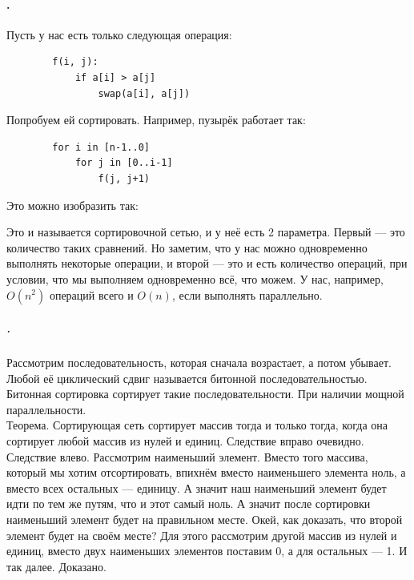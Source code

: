\documentclass{article}
\newcommand{\pseudo}{PseudoLexer.py:PseudoLexer -x}
\begin{document}
    \paragraph{.}
    Пусть у нас есть только следующая операция:
    \begin{verbatim}
        f(i, j):
            if a[i] > a[j]
                swap(a[i], a[j])
    \end{verbatim}
    Попробуем ей сортировать. Например, пузырёк работает так:
    \begin{verbatim}
        for i in [n-1..0]
            for j in [0..i-1]
                f(j, j+1)
    \end{verbatim}
    Это можно изобразить так:\\
    Это и называется сортировочной сетью, и у неё есть 2 параметра. Первый --- это количество таких сравнений. Но заметим, что у нас можно одновременно выполнять некоторые операции, и второй --- это и есть количество операций, при условии, что мы выполняем одновременно всё, что можем. У нас, например, $O(n^2)$ операций всего и $O(n)$, если выполнять параллельно.
    \subparagraph{.}
    Рассмотрим последовательность, которая сначала возрастает, а потом убывает. Любой её циклический сдвиг называется битонной последовательностью. Битонная сортировка сортирует такие последовательности. При наличии мощной параллельности.\\
    Теорема. Сортирующая сеть сортирует массив тогда и только тогда, когда она сортирует любой массив из нулей и единиц. Следствие вправо очевидно. Следствие влево. Рассмотрим наименьший элемент. Вместо того массива, который мы хотим отсортировать, впихнём вместо наименьшего элемента ноль, а вместо всех остальных --- единицу. А значит наш наименьший элемент будет идти по тем же путям, что и этот самый ноль. А значит после сортировки наименьший элемент будет на правильном месте. Окей, как доказать, что второй элемент будет на своём месте? Для этого рассмотрим другой массив из нулей и единиц, вместо двух наименьших элементов поставим 0, а для остальных --- 1. И так далее. Доказано.\\
\end{document}
